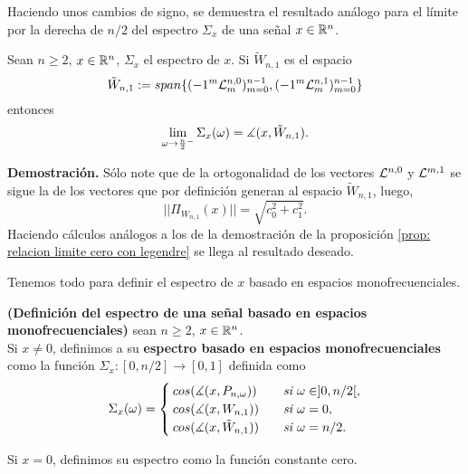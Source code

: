 Haciendo unos cambios de signo, se demuestra el resultado
análogo para el límite por la derecha de $n/2$ del espectro
$\Sigma_{x}$ de una señal $x \in \mathbb{R}^{n}$.
\begin{prop}
\label{prop: relacion limite n medios con legendre}
Sean $n \geq 2$, $x \in \mathbb{R}^{n}$,
$\Sigma_{x}$ el espectro de $x$.
Si $\tilde{W}_{n,1}$ es el espacio
\[
\tilde{W}_{n,1} := span \{ (-1^{m}\mathcal{L}^{n,0}_{m})_{m=0}^{n-1}, 
(-1^{m}\mathcal{L}^{n,1}_{m})_{m=0}^{n-1} \}
\]
entonces
\begin{equation}
\label{eq: limite por cero como angulo}
\lim\limits_{\omega \rightarrow \frac{n}{2}^{-}}{
\Sigma_{x}(\omega)} = \measuredangle(x, \tilde{W}_{n,1}).
\end{equation}
\end{prop}
\noindent
\textbf{Demostración.}
Sólo note que de la ortogonalidad de los
vectores $\mathcal{L}^{n,0}$ y $\mathcal{L}^{m,1}$
se sigue la de los vectores que por definición generan
al espacio $\tilde{W}_{n,1}$, 
luego, 
\begin{equation*}
||\Pi_{W_{n,1}}(x)|| = \sqrt{c_{0}^{2} + c_{1}^{2}}.
\end{equation*}
Haciendo cálculos análogos a los
de la demostración de la proposición 
\ref{prop: relacion limite cero con legendre} se llega
al resultado deseado.
\QEDB
\vspace{0.2cm}


Tenemos todo para definir el espectro de $x$
basado en espacios monofrecuenciales.

\begin{defi}
\label{def: espectro monofrecuenciales inicial}
\textbf{(Definición del espectro de una señal
basado en espacios monofrecuenciales)}
sean $n \geq 2$, $x \in \mathbb{R}^{n}$. \\

Si $x \neq 0$, definimos a su \textbf{espectro basado
en espacios monofrecuenciales} como la función 
$\Sigma_{x}: [0, n/2] \longrightarrow [0,1]$
definida como
\begin{align*}
\Sigma_{x}(\omega)= \begin{cases}
cos(\measuredangle(x, P_{n, \omega})) & 
\hspace{0.2cm} \textit{ si } \omega \in ]0, n/2[, \\
cos(\measuredangle(x, W_{n,1})) & \hspace{0.2cm} \textit{ si } \omega = 0, \\
cos(\measuredangle(x, \tilde{W}_{n,1})) & \hspace{0.2cm} \textit{ si } \omega = n/2.
\end{cases}
\end{align*}

Si $x = 0$, definimos su espectro como la 
función constante cero.
\end{defi}


